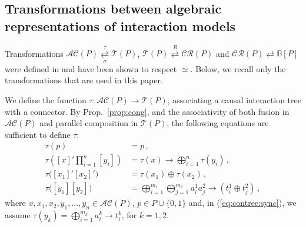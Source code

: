 \documentclass{llncs}
\newcommand{\eq}[1]{(\ref{eq:#1})}
\newcommand{\prop}[1]{Prop.~\ref{prop:#1}}
\newcommand{\sB}{\ensuremath{\mathbb{B}}}
\newcommand{\ct}{\ensuremath{\mathcal{T}}}
\newcommand{\cru}{\ensuremath{\mathcal{CR}}}
\newcommand{\ac}{\ensuremath{\mathcal{AC}}}
\begin{document}

\subsection{Transformations between algebraic representations of interaction models}
\label{secn:transformations}

Transformations $\ac(P)
\overset{\tau}{\underset{\sigma}{\rightleftarrows}} \ct(P)$, $\ct(P)
\overset{R}{\rightleftarrows} \cru(P)$ and $\cru(P) \rightleftarrows
\sB[P]$ were defined in \cite{BliSif10-causal-fmsd} and have been
shown to respect $\simeq$.  Below, we recall only the transformations
that are used in this paper.

We define the function $\tau : \ac(P) \rightarrow \ct(P)$, associating
a causal interaction tree with a connector.  By \prop{cong}, and the
associativity of both fusion in $\ac(P)$ and parallel composition in
$\ct(P)$, the following equations are sufficient to define $\tau$:
%
\begin{align}
  \label{eq:contree:p}
  \tau(p) &= p
  \,,\\
  \label{eq:contree:trigsynch}
  \tau\left(
  [x]'\prod_{i=1}^n [y_i]
  \right) &=
  \tau(x) \rightarrow \bigoplus_{i=1}^n \tau(y_i)
  \,,\\
  \label{eq:contree:trig}
  \tau\bigl([x_1]'[x_2]'\bigr) &= \tau(x_1) \oplus \tau(x_2)
  \,,\\
  \label{eq:contree:sync}  
  \tau\bigl([y_1][y_2]\bigr) &=
  \bigoplus_{i = 1}^{m_1}\bigoplus_{j = 1}^{m_2} a_i^1 a_j^2
  \rightarrow (t_i^1 \oplus t_j^2)
  \,,
\end{align}
%
where $x, x_1, x_2, y_1,\dots, y_n \in \ac(P)$, $p \in P \cup \{0,1\}$
and, in \eq{contree:sync}, we assume $\tau(y_k) = \bigoplus_{i =
  1}^{m_k} a_i^k \rightarrow t_i^k$, for $k = 1,2$.

\end{document}
